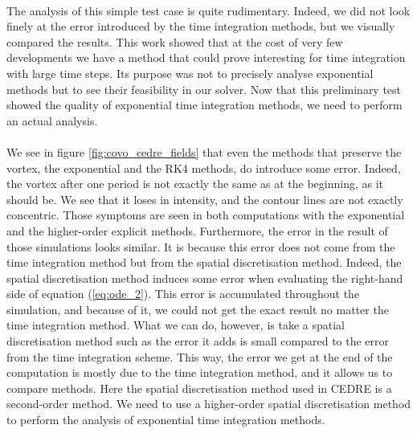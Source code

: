     \paragraph{}
    The analysis of this simple test case is quite rudimentary.
    Indeed, we did not look finely at the error introduced by the time integration methods, but we visually compared the results.
    This work showed that at the cost of very few developments we have a method that could prove interesting for time integration with large time steps.
    Its purpose was not to precisely analyse exponential methods but to see their feasibility in our solver.
    Now that this preliminary test showed the quality of exponential time integration methods, we need to perform an actual analysis.

    \paragraph{}
    We see in figure \ref{fig:covo_cedre_fields} that even the methods that preserve the vortex, the exponential and the RK4 methods, do introduce some error.
    Indeed, the vortex after one period is not exactly the same as at the beginning, as it should be.
    We see that it loses in intensity, and the contour lines are not exactly concentric.
    Those symptoms are seen in both computations with the exponential and the higher-order explicit methods.
    Furthermore, the error in the result of those simulations looks similar.
    It is because this error does not come from the time integration method but from the spatial discretisation method.
    Indeed, the spatial discretisation method induces some error when evaluating the right-hand side of equation (\ref{eq:ode_2}).
    This error is accumulated throughout the simulation, and because of it, we could not get the exact result no matter the time integration method.
    What we can do, however, is take a spatial discretisation method such as the error it adds is small compared to the error from the time integration scheme.
    This way, the error we get at the end of the computation is mostly due to the time integration method, and it allows us to compare methods.
    Here the spatial discretisation method used in CEDRE is a second-order method.
    We need to use a higher-order spatial discretisation method to perform the analysis of exponential time integration methods.
